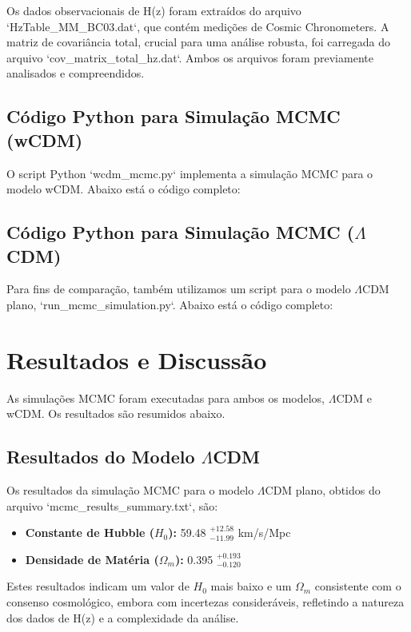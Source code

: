 \documentclass{article}
\begin{document}
Os dados observacionais de H(z) foram extraídos do arquivo `HzTable_MM_BC03.dat`, que contém medições de Cosmic Chronometers. A matriz de covariância total, crucial para uma análise robusta, foi carregada do arquivo `cov_matrix_total_hz.dat`. Ambos os arquivos foram previamente analisados e compreendidos.

\subsection{Código Python para Simulação MCMC (wCDM)}

O script Python `wcdm_mcmc.py` implementa a simulação MCMC para o modelo wCDM. Abaixo está o código completo:



\subsection{Código Python para Simulação MCMC ($\Lambda$CDM)}

Para fins de comparação, também utilizamos um script para o modelo $\Lambda$CDM plano, `run_mcmc_simulation.py`. Abaixo está o código completo:



\section{Resultados e Discussão}

As simulações MCMC foram executadas para ambos os modelos, $\Lambda$CDM e wCDM. Os resultados são resumidos abaixo.

\subsection{Resultados do Modelo $\Lambda$CDM}

Os resultados da simulação MCMC para o modelo $\Lambda$CDM plano, obtidos do arquivo `mcmc_results_summary.txt`, são:

\begin{itemize}
    \item \textbf{Constante de Hubble ($H_0$):} 59.48 $^{+12.58}_{-11.99}$ km/s/Mpc
    \item \textbf{Densidade de Matéria ($\Omega_m$):} 0.395 $^{+0.193}_{-0.120}$
\end{itemize}

Estes resultados indicam um valor de $H_0$ mais baixo e um $\Omega_m$ consistente com o consenso cosmológico, embora com incertezas consideráveis, refletindo a natureza dos dados de H(z) e a complexidade da análise.
\end{document}
